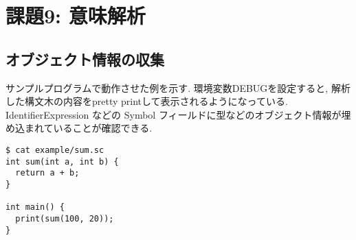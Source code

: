 \documentclass[a4j]{jarticle}
\begin{document}
\section{課題9: 意味解析}

\subsection{オブジェクト情報の収集}
サンプルプログラムで動作させた例を示す. 環境変数DEBUGを設定すると, 解析した構文木の内容をpretty printして表示されるようになっている. \\

IdentifierExpression などの Symbol フィールドに型などのオブジェクト情報が埋め込まれていることが確認できる. \\

\begin{verbatim}
$ cat example/sum.sc
int sum(int a, int b) {
  return a + b;
}

int main() {
  print(sum(100, 20));
}


\end{verbatim}
\end{document}
